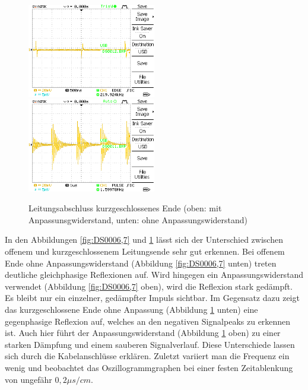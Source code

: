 \documentclass{article}
\begin{document}
				\begin{figure}[H]
					\centering
					\includegraphics[width=0.5\textwidth]{MesswerteVersuch1/DS0012.png}
					\includegraphics[width=0.5\textwidth]{MesswerteVersuch1/DS0011.png}
					\caption{Leitungsabschluss kurzgeschlossenes Ende (oben: mit Anpassunsgwiderstand, unten: ohne Anpassungswiderstand)}
					\label{fig:DS000}
				\end{figure}
                In den Abbildungen \ref*{fig:DS0006,7} und \ref*{fig:DS000} lässt sich der Unterschied zwischen offenem und 
                kurzgeschlossenem Leitungsende sehr gut erkennen. Bei offenem Ende ohne 
                Anpassungswiderstand (Abbildung \ref*{fig:DS0006,7} unten) treten deutliche gleichphasige 
                Reflexionen auf. Wird hingegen ein Anpassungswiderstand verwendet 
                (Abbildung \ref*{fig:DS0006,7} oben), wird die Reflexion stark gedämpft. Es bleibt nur 
                ein einzelner, gedämpfter Impuls sichtbar. Im Gegensatz dazu zeigt das 
                kurzgeschlossene Ende ohne Anpassung (Abbildung \ref*{fig:DS000} unten) eine gegenphasige 
                Reflexion auf, welches an den negativen Signalpeaks zu erkennen ist. Auch 
                hier führt der Anpassungswiderstand (Abbildung \ref*{fig:DS000} oben) zu einer starken 
                Dämpfung und einem sauberen Signalverlauf. Diese Unterschiede lassen sich 
                durch die Kabelanschlüsse erklären.
\clearpage
                Zuletzt variiert man die Frequenz ein wenig und beobachtet das 
                Oszillogrammgraphen bei einer festen Zeitablenkung von ungefähr $0,2 \mu s/cm$. 
\end{document}
